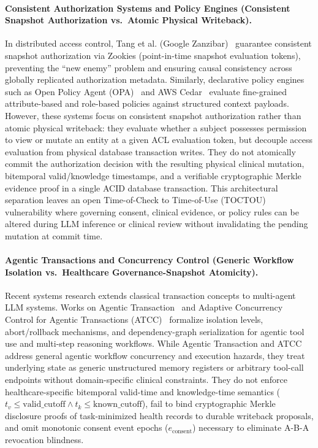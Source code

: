 \documentclass[11pt]{article}
\begin{document}
\paragraph{Consistent Authorization Systems and Policy Engines (Consistent Snapshot Authorization vs.\ Atomic Physical Writeback).}
In distributed access control, Tang et al. (Google Zanzibar)~\cite{zanzibar2019} guarantee consistent snapshot authorization via Zookies (point-in-time snapshot evaluation tokens), preventing the ``new enemy'' problem and ensuring causal consistency across globally replicated authorization metadata. Similarly, declarative policy engines such as Open Policy Agent (OPA)~\cite{opa} and AWS Cedar~\cite{cedar} evaluate fine-grained attribute-based and role-based policies against structured context payloads. However, these systems focus on consistent snapshot authorization rather than atomic physical writeback: they evaluate whether a subject possesses permission to view or mutate an entity at a given ACL evaluation token, but decouple access evaluation from physical database transaction writes. They do not atomically commit the authorization decision with the resulting physical clinical mutation, bitemporal valid/knowledge timestamps, and a verifiable cryptographic Merkle evidence proof in a single ACID database transaction. This architectural separation leaves an open Time-of-Check to Time-of-Use (TOCTOU) vulnerability where governing consent, clinical evidence, or policy rules can be altered during LLM inference or clinical review without invalidating the pending mutation at commit time.

\paragraph{Agentic Transactions and Concurrency Control (Generic Workflow Isolation vs.\ Healthcare Governance-Snapshot Atomicity).}
Recent systems research extends classical transaction concepts to multi-agent LLM systems. Works on Agentic Transaction~\cite{agentictransaction2026} and Adaptive Concurrency Control for Agentic Transactions (ATCC)~\cite{atcc2026} formalize isolation levels, abort/rollback mechanisms, and dependency-graph serialization for agentic tool use and multi-step reasoning workflows. While Agentic Transaction and ATCC address general agentic workflow concurrency and execution hazards, they treat underlying state as generic unstructured memory registers or arbitrary tool-call endpoints without domain-specific clinical constraints. They do not enforce healthcare-specific bitemporal valid-time and knowledge-time semantics ($t_v \le \text{valid\_cutoff} \land t_k \le \text{known\_cutoff}$), fail to bind cryptographic Merkle disclosure proofs of task-minimized health records to durable writeback proposals, and omit monotonic consent event epochs ($e_{\text{consent}}$) necessary to eliminate A-B-A revocation blindness.
\end{document}
